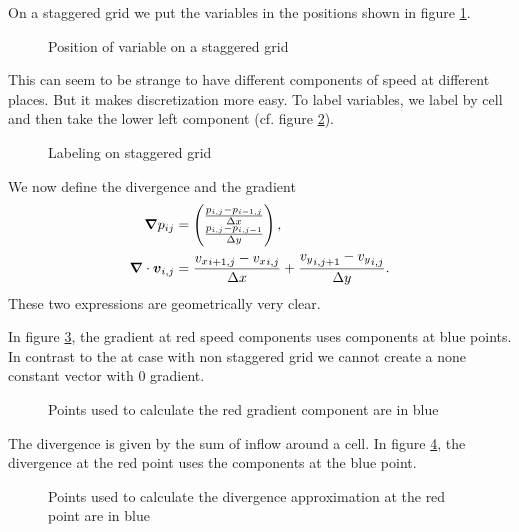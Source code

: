 On a staggered grid we put the variables in the positions shown in figure \ref{fixed:staggered}.
\begin{figure}
\caption{Position of variable on a staggered grid}
\label{fixed:staggered}
\end{figure}

This can seem to be strange to have different components of speed at different places. But it makes discretization more easy.
To label variables, we label by cell and then take the lower left component (cf. figure \ref{fixed:staggered_label}).
\begin{figure}
\caption{Labeling on staggered grid}
\label{fixed:staggered_label}
\end{figure}

We now define the divergence and the gradient
\begin{align}
  {\boldsymbol {\nabla}}p_{ij}&=\begin{pmatrix}
    \frac{p_{i,j}-p_{i-1,j}}{\Delta x}\\
    \frac{p_{i,j}-p_{i,j-1}}{\Delta y}\\
                      \end{pmatrix},\\
  {\boldsymbol {\nabla}}\cdot {\boldsymbol {v}}_{i,j}&=\frac{{v_{x}}_{i+1,j}-{v_{x}}_{i,j}}{\Delta x}+\frac{{v_{y}}_{i,j+1}-{v_{y}}_{i,j}}{\Delta y}.
\end{align}
These two expressions are geometrically very clear.

In figure \ref{fixed:staggered_gradient}, the gradient at red speed components uses components at blue points.
In contrast to the at case with non staggered grid we cannot create a none constant vector with 0 gradient.
\begin{figure}
\caption{Points used to calculate the red gradient component are in blue}
\label{fixed:staggered_gradient}
\end{figure}

The divergence is given by the sum of inflow around a cell.
In figure \ref{fixed:staggered_divergence}, the divergence at the red point uses the components at the blue point.
\begin{figure}
\caption{Points used to calculate the divergence approximation at the red point are in blue}
\label{fixed:staggered_divergence}
\end{figure}

